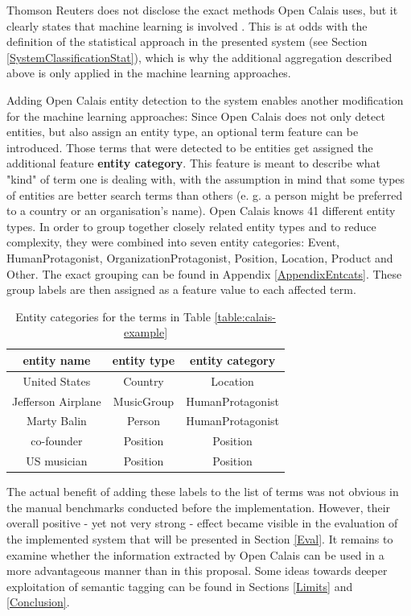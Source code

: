 \documentclass[11pt,a4paper,twoside]{article}
\begin{document}
Thomson Reuters does not disclose the exact methods Open Calais uses, but it clearly states that machine learning is involved \cite{ThomsonReuters2018ThomsonGuide}. This is at odds with the definition of the statistical approach in the presented system (see Section \ref{SystemClassificationStat}), which is why the additional aggregation described above is only applied in the machine learning approaches.

\bigskip

Adding Open Calais entity detection to the system enables another modification for the machine learning approaches: Since Open Calais does not only detect entities, but also assign an entity type, an optional term feature can be introduced. Those terms that were detected to be entities get assigned the additional feature \textbf{entity category}. This feature is meant to describe what "kind" of term one is dealing with, with the assumption in mind that some types of entities are better search terms than others (e. g. a person might be preferred to a country or an organisation's name). Open Calais knows 41 different entity types. In order to group together closely related entity types and to reduce complexity, they were combined into seven entity categories: Event, HumanProtagonist, OrganizationProtagonist, Position, Location, Product and Other. The exact grouping can be found in Appendix \ref{AppendixEntcats}. These group labels are then assigned as a feature value to each affected term.

\begin{table}[b]
    \caption{Entity categories for the terms in Table \ref{table:calais-example}}
    \centering
    \begin{tabular}{|c|c|c|}
        \hline
        \textbf{entity name} & \textbf{entity type} & \textbf{entity category} \\
        \hline
        United States & Country & Location \\
        Jefferson Airplane & MusicGroup & HumanProtagonist \\
        Marty Balin & Person & HumanProtagonist \\
        co-founder & Position & Position \\
        US musician & Position & Position \\
        \hline 
    \end{tabular}
    \label{table:entcat-example}
\end{table}

The actual benefit of adding these labels to the list of terms was not obvious in the manual benchmarks conducted before the implementation. However, their overall positive - yet not very strong - effect became visible in the evaluation of the implemented system that will be presented in Section \ref{Eval}. It remains to examine whether the information extracted by Open Calais can be used in a more advantageous manner than in this proposal. Some ideas towards deeper exploitation of semantic tagging can be found in Sections \ref{Limits} and \ref{Conclusion}.
\end{document}
